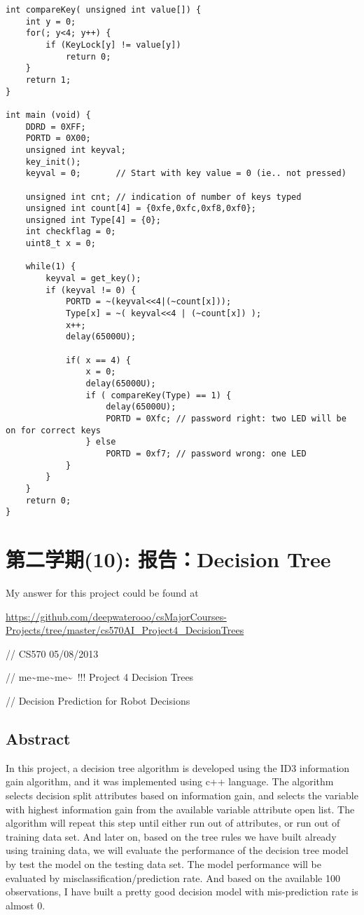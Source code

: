 \documentclass[12pt]{book}
\begin{document}
\begin{lstlisting}
int compareKey( unsigned int value[]) {
    int y = 0; 
    for(; y<4; y++) {
        if (KeyLock[y] != value[y])
            return 0;
    }
    return 1;
}

int main (void) {
    DDRD = 0XFF;
    PORTD = 0X00;
    unsigned int keyval;
    key_init();
    keyval = 0;       // Start with key value = 0 (ie.. not pressed)

    unsigned int cnt; // indication of number of keys typed
    unsigned int count[4] = {0xfe,0xfc,0xf8,0xf0};
    unsigned int Type[4] = {0};
    int checkflag = 0;
    uint8_t x = 0;

    while(1) {
        keyval = get_key();
        if (keyval != 0) {
            PORTD = ~(keyval<<4|(~count[x]));
            Type[x] = ~( keyval<<4 | (~count[x]) );
            x++;
            delay(65000U);

            if( x == 4) {
                x = 0;
                delay(65000U);
                if ( compareKey(Type) == 1) {
                    delay(65000U);
                    PORTD = 0Xfc; // password right: two LED will be on for correct keys
                } else                
                    PORTD = 0xf7; // password wrong: one LED
            }
        }
    }
    return 0;    
}
\end{lstlisting}

\section{第二学期(10): 报告：Decision Tree}
\label{sec-4-10}

My answer for this project could be found at

\url{https://github.com/deepwaterooo/csMajorCourses-Projects/tree/master/cs570AI_Project4_DecisionTrees}

// CS570                                05/08/2013

// me\textasciitilde{}me\textasciitilde{}me\textasciitilde{}~!!!     Project 4 Decision Trees 

// Decision Prediction for Robot Decisions

\subsection{Abstract}
\label{sec-4-10-1}

In this project, a decision tree algorithm is developed using the ID3 information gain algorithm, and it was implemented using c++ language. The algorithm selects decision split attributes based on information gain, and selects the variable with highest information gain from the available variable attribute open list. The algorithm will repeat this step until either run out of attributes, or run out of training data set. And later on, based on the tree rules we have built already using training data, we will evaluate the performance of the decision tree model by test the model on the testing data set. The model performance will be evaluated by misclassification/prediction rate. And based on the available 100 observations, I have built a pretty good decision model with mis-prediction rate is almost 0. 
\end{document}
